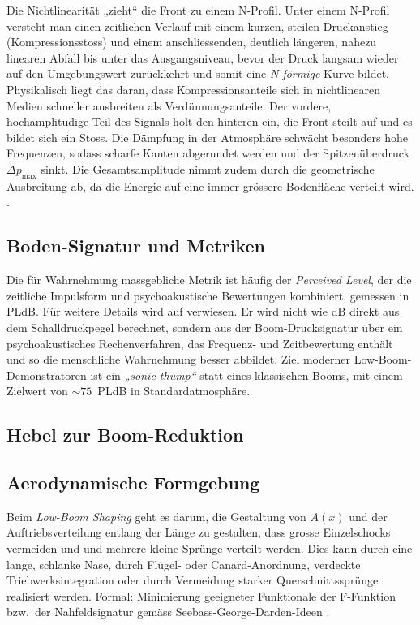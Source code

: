 Die Nichtlinearität „zieht“ die Front zu einem N-Profil.
Unter einem N-Profil versteht man einen zeitlichen Verlauf mit einem kurzen,
steilen Druckanstieg (Kompressionsstoss) und einem anschliessenden, deutlich
längeren, nahezu linearen Abfall bis unter das Ausgangsniveau, bevor der
Druck langsam wieder auf den Umgebungswert zurückkehrt und somit eine
\emph{N-förmige} Kurve bildet.
Physikalisch liegt das daran, dass Kompressionsanteile sich in nichtlinearen
Medien schneller ausbreiten als Verdünnungsanteile: Der vordere,
hochamplitudige Teil des Signals holt den hinteren ein, die Front steilt
auf und es bildet sich ein Stoss.
Die Dämpfung in der Atmosphäre schwächt besonders hohe Frequenzen,
sodass scharfe Kanten abgerundet werden und der Spitzenüberdruck
\(\Delta p_\mathrm{max}\) sinkt.
Die Gesamtsamplitude nimmt zudem durch die geometrische Ausbreitung ab, da
die Energie auf eine immer grössere Bodenfläche verteilt wird.
\cite{schall:rallabhandi2023,schall:burgersJASA}.

\subsection{Boden-Signatur und Metriken}
Die für Wahrnehmung massgebliche Metrik ist häufig der \textit{Perceived Level},
der die zeitliche Impulsform und psychoakustische Bewertungen kombiniert,
gemessen in PLdB. Für weitere Details wird auf \cite{schall:x59pldb} verwiesen.
Er wird nicht wie dB direkt aus dem Schalldruckpegel berechnet,
sondern aus der Boom-Drucksignatur über ein psychoakustisches Rechenverfahren,
das Frequenz- und Zeitbewertung enthält und so die menschliche
Wahrnehmung besser abbildet.
Ziel moderner Low-Boom-Demonstratoren ist ein \emph{„sonic thump“} statt
eines klassischen Booms, mit einem Zielwert von
${\sim}75$\ PLdB in Standardatmosphäre.

\subsection{Hebel zur Boom-Reduktion}
\subsection*{Aerodynamische Formgebung}
Beim \emph{Low-Boom Shaping} geht es darum, die Gestaltung von $A(x)$ und
der Auftriebsverteilung entlang der Länge zu gestalten, dass
grosse Einzelschocks vermeiden und und mehrere kleine Sprünge verteilt werden.
Dies kann durch eine lange, schlanke Nase, durch Flügel- oder Canard-Anordnung,
verdeckte Triebwerksintegration oder durch Vermeidung starker
Querschnittssprünge realisiert werden.
Formal: Minimierung geeigneter Funktionale der F-Funktion bzw.\ der Nahfeldsignatur
gemäss Seebass-George-Darden-Ideen \cite{schall:seebassgeorge,schall:darden75}.

